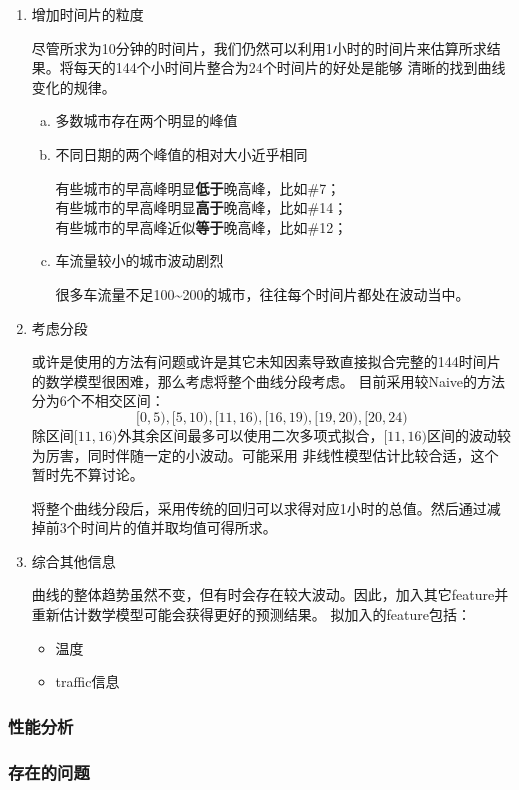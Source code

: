 \documentclass[hyperref,UTF8]{ctexart}
\theoremstyle{definition}
\theoremstyle{remark}
\numberwithin{equation}{subsection}
\newcommand{\Emph}{\textbf}
\begin{document}
	\begin{enumerate}[(1)]
		
		\item 增加时间片的粒度
		
		尽管所求为10分钟的时间片，我们仍然可以利用1小时的时间片来估算所求结果。将每天的144个小时间片整合为24个时间片的好处是能够
		清晰的找到曲线变化的规律。
		
		\begin{enumerate}[(a)]
			
			\item 多数城市存在两个明显的峰值
			
			\item 不同日期的两个峰值的相对大小近乎相同
			
			有些城市的早高峰明显\Emph{低于}晚高峰，比如\#7；    \\
			有些城市的早高峰明显\Emph{高于}晚高峰，比如\#14；   \\
			有些城市的早高峰近似\Emph{等于}晚高峰，比如\#12；   
			
			\item 车流量较小的城市波动剧烈
			
			很多车流量不足100\~{}200的城市，往往每个时间片都处在波动当中。
			
		\end{enumerate}
		
		\item 考虑分段
		
		或许是使用的方法有问题或许是其它未知因素导致直接拟合完整的144时间片的数学模型很困难，那么考虑将整个曲线分段考虑。
		目前采用较Naive的方法分为6个不相交区间：
		\[
			[0, 5), [5, 10), [11, 16), [16, 19), [19, 20), [20, 24)
		\]
		除区间$[11, 16)$外其余区间最多可以使用二次多项式拟合，$[11, 16)$区间的波动较为厉害，同时伴随一定的小波动。可能采用
		非线性模型估计比较合适，这个暂时先不算讨论。
		
		将整个曲线分段后，采用传统的回归可以求得对应1小时的总值。然后通过减掉前3个时间片的值并取均值可得所求。
		
		\item 综合其他信息
		
		曲线的整体趋势虽然不变，但有时会存在较大波动。因此，加入其它feature并重新估计数学模型可能会获得更好的预测结果。
		拟加入的feature包括：
		\begin{itemize}
			\item 温度
			\item traffic信息
		\end{itemize}
	
	\end{enumerate}

\subsubsection{性能分析}
	
\subsubsection{存在的问题}
\end{document}
